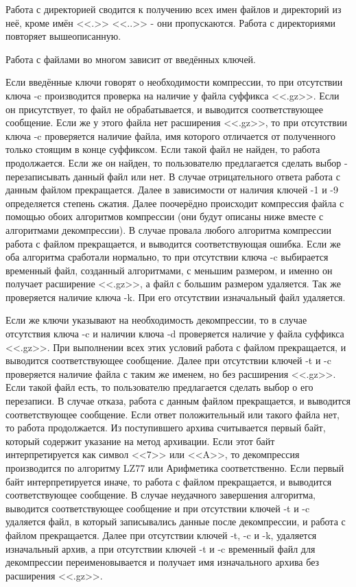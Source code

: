 \documentclass[12pt]{article}
\begin{document}
Работа с директорией сводится к получению всех имен файлов и директорий из неё, кроме имён <<.>> <<..>> - они пропускаются. Работа с директориями повторяет вышеописанную.

Работа с файлами во многом зависит от введённых ключей. 

Если введённые ключи говорят о необходимости компрессии, то при отсутствии ключа -c производится проверка на наличие у файла суффикса <<.gz>>. Если он присутствует, то файл не обрабатывается, и выводится соответствующее сообщение. Если же у этого файла нет расширения <<.gz>>, то при отсутствии ключа -c проверяется наличие файла, имя которого отличается от полученного только стоящим в конце суффиксом. Если такой файл не найден, то работа продолжается. Если же он найден, то пользователю предлагается сделать выбор - перезаписывать данный файл или нет. В случае отрицательного ответа работа с данным файлом прекращается. Далее в зависимости от наличия ключей -1 и -9 определяется степень сжатия. Далее поочерёдно происходит компрессия файла с помощью обоих алгоритмов компрессии (они будут описаны ниже вместе с алгоритмами декомпрессии). В случае провала любого алгоритма компрессии работа с файлом прекращается, и выводится соответствующая ошибка. Если же оба алгоритма сработали нормально, то при отсутствии ключа -c выбирается временный файл, созданный алгоритмами, с меньшим размером, и именно он получает расширение <<.gz>>, а файл с большим размером удаляется. Так же проверяется наличие ключа -k. При его отсутствии изначальный файл удаляется.

Если же ключи указывают на необходимость декомпрессии, то в случае отсутствия ключа -c и наличии ключа -d проверяется наличие у файла суффикса <<.gz>>. При выполнении всех этих условий работа с файлом прекращается, и выводится соответствующее сообщение. Далее при отсутствии ключей -t и -c проверяется наличие файла с таким же именем, но без расширения <<.gz>>. Если такой файл есть, то пользователю предлагается сделать выбор о его перезаписи. В случае отказа, работа с данным файлом прекращается, и выводится соответствующее сообщение. Если ответ положительный или такого файла нет, то работа продолжается. Из поступившего архива считывается первый байт, который содержит указание на метод архивации. Если этот байт интерпретируется как символ <<7>> или <<A>>, %
то декомпрессия производится по алгоритму LZ77 или Арифметика соответственно. Если первый байт интерпретируется иначе, то работа с файлом прекращается, и выводится соответствующее сообщение. В случае неудачного завершения алгоритма, выводится соответствующее сообщение и при отсутствии ключей -t и -c удаляется файл, в который записывались данные после декомпрессии, и работа с файлом прекращается. Далее при отсутствии ключей -t, -c и -k, удаляется изначальный архив, а при отсутствии ключей -t и -c временный файл для декомпрессии переименовывается и получает имя изначального архива без расширения <<.gz>>.
\end{document}
